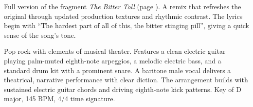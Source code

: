
\label{sec:the-bitter-toll-remix}

\begin{notes}
Full version of the fragment \emph{The Bitter Toll} (page \pageref{sec:the-bitter-toll}). A remix that refreshes the original through updated production textures and rhythmic contrast. %
The lyrics begin with “The hardest part of all of this, the bitter stinging pill”, giving a quick sense of the song’s tone.
\end{notes}

\begin{style}
Pop rock with elements of musical theater. %
Features a clean electric guitar playing palm-muted eighth-note arpeggios, a melodic electric bass, and a standard drum kit with a prominent snare. %
A baritone male vocal delivers a theatrical, narrative performance with clear diction. %
The arrangement builds with sustained electric guitar chords and driving eighth-note kick patterns. %
Key of D major, 145 BPM, 4/4 time signature.
\end{style}

